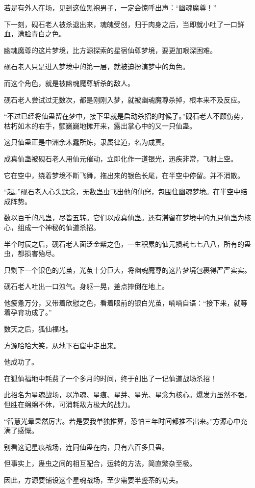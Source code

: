 \begin{this_body}
若是有外人在场，见到这位黑袍男子，一定会惊呼出声：“幽魂魔尊！”

下一刻，砚石老人被杀退出来，魂魄受创，归于肉身之后，当即就小吐了一口鲜血，满脸青白之色。

幽魂魔尊的这片梦境，比方源探索的星宿仙尊梦境，要更加艰深困难。

砚石老人只是进入梦境中的第一层，就被迫扮演梦中的角色。

而这个角色，就是被幽魂魔尊斩杀的敌人。

砚石老人尝试过无数次，都是刚刚入梦，就被幽魂魔尊杀掉，根本来不及反应。

“不过已经将仙蛊留在梦中，接下里就是启动杀招的时候了。”砚石老人不顾伤势，枯朽如木的右手，颤巍巍地摊开来，露出掌心中的又一只仙蛊。

这只仙蛊正是中洲余木蠢所炼，隶属律道，名为成真。

成真仙蛊被砚石老人用仙元催动，立即化作一道银光，迅疾非常，飞射上空。

它在空中，绕着梦境不断飞舞，拖出来的银色长尾，在半空中停留。并不消散。

“起。”砚石老人心头默念，无数蛊虫飞出他的仙窍，包围住幽魂梦境。在半空中结成阵势。

数以百千的凡蛊，尽皆五转。它们以成真仙蛊。还有滞留在梦境中的九只仙蛊为核心，组成一个神秘的仙道杀招。

半个时辰之后，砚石老人面泛金紫之色，一生积累的仙元损耗七七八八，所有的蛊虫，都损害殆尽。

只剩下一个银色的光茧，光茧十分巨大，将幽魂魔尊的这片梦境包裹得严严实实。

砚石老人吐出一口浊气。身躯一晃，差点摔倒在地上。

他疲惫万分，又带着欣慰之色，看着眼前的银白光茧，喃喃自语：“接下来，就等着孕育功成了。”

数天之后，狐仙福地。

方源哈哈大笑，从地下石窟中走出来。

他成功了。

在狐仙福地中耗费了一个多月的时间，终于创出了一记仙道战场杀招！

此招名为星魂战场，以净魂、星痕、星芽、星光、星念为核心。爆发力虽然不强，但胜在绵绵不休，可消耗敌方极大的战力。

“智慧光晕果然厉害。若是要我单独推算，恐怕三年时间都推不出来。”方源心中充满了感慨。

别看这记星痕战场，连同仙蛊在内，只有六百多只蛊。

但事实上，蛊虫之间的相互配合，运转的方法，简直繁杂至极。

因此，方源要铺设这个星魂战场，至少需要半盏茶的功夫。


\end{this_body}

